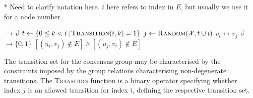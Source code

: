 

%

* Need to clarify notation here. $i$ here refers to index in $E$, but usually we use it for a node number.


%

\begin{algorithm}[H]
	\begin{algorithmic}
		 $\to \vec{v}$ 
		 
		\State $t \gets \{0\leq k< i \,|\, \textsc{Transition}(i,k) = 1\}$ 
		\State $j \gets \textsc{Random}(\mathcal{X}, t \cup i)$ 
		\State $v_i\leftrightarrow v_j$ 
		\EndFor
		\State \Return $\vec{v}$
		\EndFunction
		\\
		 $\to \{0,1\}$ 
		\State \Return $[(u_i,v_j) \notin E] \land [(u_j,v_i) \notin E]$
		\EndFunction
	\end{algorithmic}
	\caption{The transition set for the consensus group may be characterised by the constraints imposed by the group relations characterising non-degenerate transitions. The \textsc{Transition} function is a binary operator specifying whether index $j$ is an allowed transition for index $i$, defining the respective transition set.}\label{alg:consensus_shuffle}
\end{algorithm}

